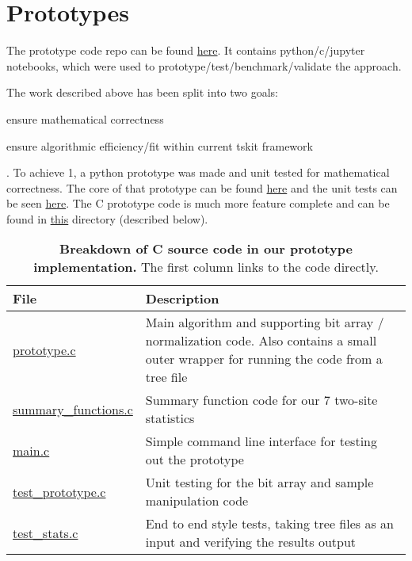 \documentclass[12pt]{article}
\begin{document}
\section{Prototypes}
The prototype code repo can be found
\href{https://github.com/lkirk/ts-two-locus-proto/}{here}. It contains
python/c/jupyter notebooks, which were used to prototype/test/benchmark/validate
the approach.

The work described above has been split into two goals:
\begin{enumerate*}
\item ensure mathematical correctness
\item ensure algorithmic efficiency/fit within current tskit framework
\end{enumerate*}.
To achieve 1, a python prototype was made and unit tested for mathematical
correctness. The core of that prototype can be found
\href{https://github.com/lkirk/ts-two-locus-proto/blob/main/two_locus_proto/site.py}{here}
and the unit tests can be seen
\href{https://github.com/lkirk/ts-two-locus-proto/blob/main/test/test_ld_proto.py}{here}.
The C prototype code is much more feature complete and can be found in
\href{https://github.com/lkirk/ts-two-locus-proto/tree/main/c}{this} directory
(described below).

\newlength\q
\setlength{}

\begin{table}[H]
  \begin{tabular}{ lp{\q} }
    File & Description \\
    \hline
\href{https://github.com/lkirk/ts-two-locus-proto/blob/main/c/prototype.c}{prototype.c}
& Main algorithm and supporting bit array / normalization code. Also contains a
small outer wrapper for running the code from a tree file \\
\href{https://github.com/lkirk/ts-two-locus-proto/blob/main/c/summary_functions.c}{summary\_functions.c}
& Summary function code for our 7 two-site statistics \\
\href{https://github.com/lkirk/ts-two-locus-proto/blob/main/c/main.c}{main.c} &
Simple command line interface for testing out the prototype \\
\href{https://github.com/lkirk/ts-two-locus-proto/blob/main/c/test_prototype.c}{test\_prototype.c}
& Unit testing for the bit array and sample manipulation code \\
\href{https://github.com/lkirk/ts-two-locus-proto/blob/main/c/test_stats.c}{test\_stats.c}
& End to end style tests, taking tree files as an input and verifying the
results output \\
  \end{tabular}
  \caption{
    \textbf{Breakdown of C source code in our prototype implementation.}
    The first column links to the code directly.
  }
\end{table}




\end{document}
